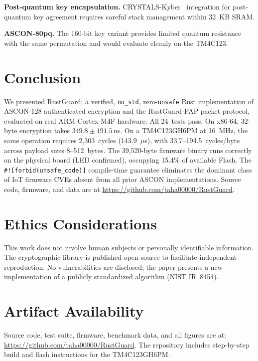 \documentclass[anonymous]{ndss}
\newcommand{\code}[1]{\mbox{\texttt{#1}}}
\newcommand{\nstd}{\texttt{no\_std}}
\newcommand{\forbid}{\code{\#![forbid(unsafe\_code)]}}
\begin{document}
\textbf{Post-quantum key encapsulation.} CRYSTALS-Kyber~\cite{b20}
integration for post-quantum key agreement requires careful stack management
within 32~KB SRAM.

\textbf{ASCON-80pq.} The 160-bit key variant provides limited quantum
resistance with the same permutation and would evaluate cleanly on the
TM4C123.

\section{Conclusion}
\label{sec:conclusion}

We presented RustGuard: a verified, \nstd{}, zero-\texttt{unsafe} Rust
implementation of ASCON-128 authenticated encryption and the RustGuard-PAP
packet protocol, evaluated on real ARM Cortex-M4F hardware. All 24~tests pass.
On x86-64, 32-byte encryption takes $349.8\pm191.5$\,ns. On a TM4C123GH6PM
at 16~MHz, the same operation requires 2{,}303~cycles (143.9~$\mu$s), with
33.7--194.5~cycles/byte across payload sizes 8--512~bytes. The 39{,}520-byte
firmware binary runs correctly on the physical board (LED confirmed),
occupying 15.4\% of available Flash. The \forbid{} compile-time guarantee
eliminates the dominant class of IoT firmware CVEs absent from all prior
ASCON implementations. Source code, firmware, and data are at
\url{https://github.com/taha00000/RustGuard}.

\section*{Ethics Considerations}

This work does not involve human subjects or personally identifiable
information. The cryptographic library is published open-source to facilitate
independent reproduction. No vulnerabilities are disclosed; the paper presents
a new implementation of a publicly standardized algorithm (NIST IR~8454).

\section*{Artifact Availability}

Source code, test suite, firmware, benchmark data, and all figures are at:
\url{https://github.com/taha00000/RustGuard}.
The repository includes step-by-step build and flash instructions for the
TM4C123GH6PM.
\end{document}
